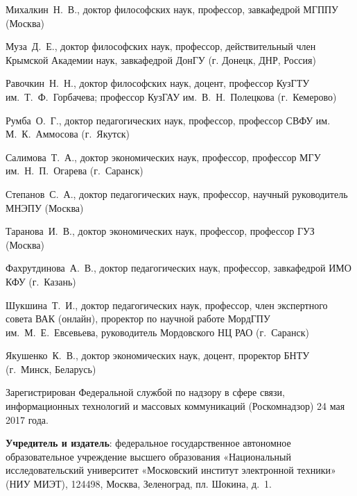 \begin{multicols}{2}
    \noindent Михалкин Н. В., доктор философских наук, профессор, завкафедрой МГППУ (Москва)
    
    \noindent Муза Д. Е., доктор философских наук, профессор, действительный член Крымской Академии наук, завкафедрой ДонГУ (г. Донецк, ДНР, Россия) 
    
    \noindent Равочкин Н. Н., доктор философских наук, доцент, профессор КузГТУ им. Т. Ф. Горбачева; профессор КузГАУ им. В. Н. Полецкова (г. Кемерово)
    
    \noindent Румба О. Г., доктор педагогических наук, профессор, профессор СВФУ им. М. К. Аммосова (г. Якутск)
    
    \noindent Салимова Т. А., доктор экономических наук, профессор, профессор МГУ им. Н. П. Огарева (г. Саранск)
    
    \noindent Степанов С. А., доктор педагогических наук, профессор, научный руководитель МНЭПУ (Москва)
    
    \noindent Таранова И. В., доктор экономических наук, профессор, профессор ГУЗ (Москва)
   
    \noindent Фахрутдинова А. В., доктор педагогических наук, профессор, завкафедрой ИМО КФУ (г. Казань)
    
    \noindent Шукшина Т. И., доктор педагогических наук, профессор, член экспертного совета ВАК (онлайн), проректор по научной работе МордГПУ им. М. Е. Евсевьева, руководитель Мордовского НЦ РАО (г. Саранск)
    
    \noindent Якушенко К. В., доктор экономических наук, доцент, проректор БНТУ (г. Минск, Беларусь)
\end{multicols}

\begin{flushleft}
\footnotesize
Зарегистрирован Федеральной службой по надзору в сфере связи, информационных технологий
и массовых коммуникаций (Роскомнадзор) 24 мая 2017 года.


\textbf{Учредитель и издатель}: федеральное государственное автономное образовательное учреждение
высшего образования «Национальный исследовательский университет «Московский институт
электронной техники» (НИУ МИЭТ), 124498, Москва, Зеленоград, пл. Шокина, д. 1.
\end{flushleft}

